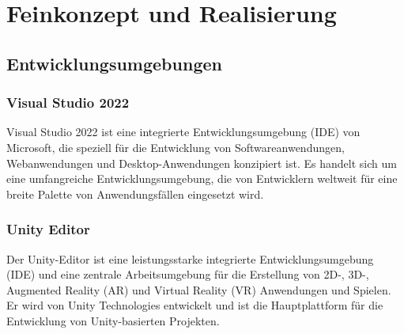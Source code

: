 

\chapter{Feinkonzept und Realisierung}

\section{Entwicklungsumgebungen}
\subsection{Visual Studio 2022}
Visual Studio 2022 ist eine integrierte Entwicklungsumgebung (IDE) von Microsoft, die speziell für die Entwicklung von
Softwareanwendungen, Webanwendungen und Desktop-Anwendungen konzipiert ist. Es handelt sich um eine umfangreiche
Entwicklungsumgebung, die von Entwicklern weltweit für eine breite Palette von Anwendungsfällen eingesetzt wird.

\subsection{Unity Editor}
Der Unity-Editor ist eine leistungsstarke integrierte Entwicklungsumgebung (IDE) und eine zentrale Arbeitsumgebung
für die Erstellung von 2D-, 3D-, Augmented Reality (AR) und Virtual Reality (VR) Anwendungen und Spielen. Er wird von
Unity Technologies entwickelt und ist die Hauptplattform für die Entwicklung von Unity-basierten Projekten.

